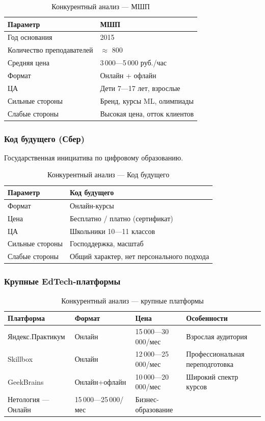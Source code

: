 \documentclass[12pt,a4paper]{article}
\begin{document}
\begin{table}[H]
\centering
\caption{Конкурентный анализ --- МШП}
\label{tab:msp_analysis}
\begin{tabular}{ll}
\toprule
Параметр & МШП \\
\midrule
Год основания & 2015 \\
Количество преподавателей & ${\approx}$ 800 \\
Средняя цена & 3\,000---5\,000 руб./час \\
Формат & Онлайн + офлайн \\
ЦА & Дети 7---17 лет, взрослые \\
Сильные стороны & Бренд, курсы ML, олимпиады \\
Слабые стороны & Высокая цена, отток клиентов \\
\bottomrule
\end{tabular}
\end{table}

\subsubsection{Код будущего (Сбер)}

Государственная инициатива по цифровому образованию.

\begin{table}[H]
\centering
\caption{Конкурентный анализ --- Код будущего}
\label{tab:code_future}
\begin{tabular}{ll}
\toprule
Параметр & Код будущего \\
\midrule
Формат & Онлайн-курсы \\
Цена & Бесплатно / платно (сертификат) \\
ЦА & Школьники 10---11 классов \\
Сильные стороны & Господдержка, масштаб \\
Слабые стороны & Общий характер, нет персонального подхода \\
\bottomrule
\end{tabular}
\end{table}

\subsubsection{Крупные EdTech-платформы}

\begin{table}[H]
\centering
\caption{Конкурентный анализ --- крупные платформы}
\label{tab:edtech_competitors}
\begin{tabular}{llll}
\toprule
Платформа & Формат & Цена & Особенности \\
\midrule
Яндекс.Практикум & Онлайн & 15\,000---30\,000/мес & Взрослая аудитория \\
Skillbox & Онлайн & 12\,000---25\,000/мес & Профессиональная переподготовка \\
GeekBrains & Онлайн+офлайн & 10\,000---20\,000/мес & Широкий спектр курсов \\
Нетология --- Онлайн & 15\,000---25\,000/мес & Бизнес-образование \\
\bottomrule
\end{tabular}
\end{table}
\end{document}

